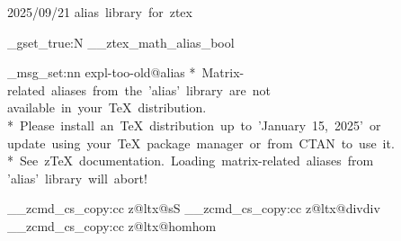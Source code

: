   {2025/09/21}{\ztex@versi@n}
  {alias~library~for~ztex}


\bool_gset_true:N \g__ztex_math_alias_bool
\RequirePackage{amssymb, mathrsfs}
\RequirePackage{mathtools}


\ztex_msg_set:nn { expl-too-old@alias }
  {
    *~Matrix-related~aliases~from~the~'alias'~library~are~not~
    available~in~your~TeX~distribution. \\
    *~Please~install~an~TeX~distribution~up~to~'January~15,~2025'~or~
    update~using~your~TeX~package~manager~or~from~CTAN~to~use~it. \\
    *~See~zTeX~documentation.~Loading~matrix-related~aliases~from~
    'alias'~library~will~abort!
  }


\__zcmd_cs_copy:cc {z@ltx@s}{S}
\__zcmd_cs_copy:cc {z@ltx@div}{div}
\__zcmd_cs_copy:cc {z@ltx@hom}{hom}


